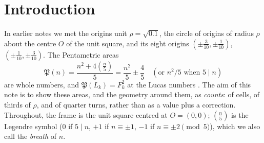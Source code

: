 \documentclass[11pt,a4paper]{article}
\theoremstyle{plain}
\theoremstyle{definition}
\theoremstyle{remark}
\newcommand{\Pa}{\mathfrak{P}}
\newcommand{\leg}[1]{\left(\tfrac{#1}{5}\right)}
\begin{document}
\section{Introduction}
In earlier notes \cite{gt,rhombus,origins} we met the origins unit $\rho=\sqrt{0.1}$, the circle of origins of radius $\rho$ about the centre $O$ of the unit square, and its eight origins $(\pm\tfrac3{10},\pm\tfrac1{10})$, $(\pm\tfrac1{10},\pm\tfrac3{10})$. The Pentametric areas
\[
\Pa(n)=\frac{n^2+4\leg{n}}{5}=\frac{n^2}{5}\pm\frac45\quad(\text{or }n^2/5\text{ when }5\mid n)
\]
are whole numbers, and $\Pa(L_k)=F_k^2$ at the Lucas numbers \cite{gt}. The aim of this note is to show these areas, and the geometry around them, as \emph{counts}: of cells, of thirds of $\rho$, and of quarter turns, rather than as a value plus a correction. Throughout, the frame is the unit square centred at $O=(0,0)$; $\leg{n}$ is the Legendre symbol ($0$ if $5\mid n$, $+1$ if $n\equiv\pm1$, $-1$ if $n\equiv\pm2 \pmod 5$), which we also call the \emph{breath} of $n$.
\end{document}
